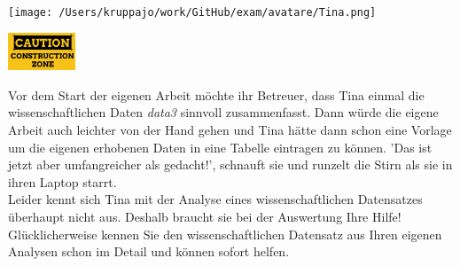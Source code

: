 \documentclass[a4paper, 9pt]{scrartcl}\usepackage[]{graphicx}\usepackage[]{xcolor}
\begin{document}
 
\begin{minipage}[t]{0.5\textwidth}
\texttt{[image: /Users/kruppajo/work/GitHub/exam/avatare/Tina.png]}
\end{minipage}
\begin{minipage}[t]{0.5\textwidth}
\hfill
\href{https://youtu.be/C9skfFRTHhI}{\includegraphics[width = 2cm]{img/caution}}
\end{minipage}
\vspace{1ex}



Vor dem Start der eigenen Arbeit möchte ihr Betreuer, dass Tina einmal die wissenschaftlichen Daten \textit{data3} sinnvoll zusammenfasst. Dann würde die eigene Arbeit auch leichter von der Hand gehen und Tina hätte dann schon eine Vorlage um die eigenen erhobenen Daten in eine Tabelle eintragen zu können. 'Das ist jetzt aber umfangreicher als gedacht!', schnauft sie und runzelt die Stirn als sie in ihren Laptop starrt.\\

Leider kennt sich Tina mit der Analyse eines wissenschaftlichen Datensatzes überhaupt nicht aus. Deshalb braucht sie bei der Auswertung Ihre Hilfe! Glücklicherweise kennen Sie den wissenschaftlichen Datensatz aus Ihren eigenen Analysen schon im Detail und können sofort helfen.
\end{document}

